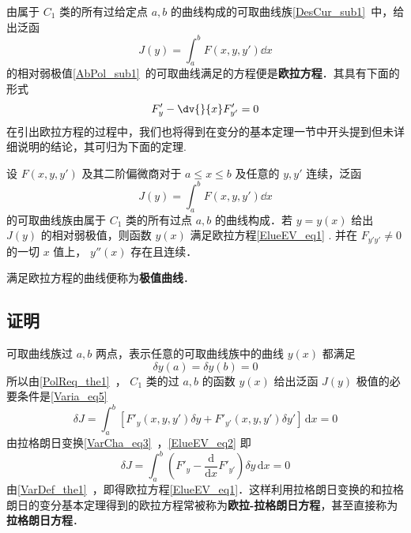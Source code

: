 
由属于 $C_1$ 类的所有过给定点 $a,b$ 的曲线构成的可取曲线族\autoref{DesCur_sub1}~中，给出泛函 
\begin{equation}
J(y)=\int_a^bF(x,y,y')\dd x
\end{equation}
的相对弱极值\autoref{AbPol_sub1}~的可取曲线满足的方程便是\textbf{欧拉方程}．其具有下面的形式
\begin{equation}\label{ElueEV_eq1}
F'_y-\dv{}{x}F'_{y'}=0
\end{equation}
在引出欧拉方程的过程中，我们也将得到在变分的基本定理一节中开头提到但未详细说明的结论，其可归为下面的定理.
\begin{theorem}{}
设 $F(x,y,y')$ 及其二阶偏微商对于 $a\leq x\leq b$ 及任意的 $y,y'$ 连续，泛函
\begin{equation}
J(y)=\int_a^b F(x,y,y')\dd x
\end{equation}
的可取曲线族由属于 $C_1$ 类的所有过点 $a,b$ 的曲线构成．若 $y=y(x)$ 给出 $J(y)$ 的相对弱极值，则函数 $y(x)$ 满足欧拉方程\autoref{ElueEV_eq1} .
并在 $F_{y'y'}\neq0$ 的一切 $x$ 值上， $y''(x)$ 存在且连续．

\end{theorem}
满足欧拉方程的曲线便称为\textbf{极值曲线}．
\subsection{证明}
可取曲线族过 $a,b$ 两点，表示任意的可取曲线族中的曲线 $y(x)$ 都满足 
\begin{equation}
\delta y(a)=\delta y(b)=0
\end{equation}
所以由\autoref{PolReq_the1}~， $C_1$ 类的过 $a,b$ 的函数 $y(x)$ 给出泛函 $J(y)$ 极值的必要条件是\autoref{Varia_eq5}~
\begin{equation}\label{ElueEV_eq2}
\delta J=\int_a^b \left[F'_y(x,y,y')\delta y+F'_{y'}(x,y,y')\delta y' \right]  \,\mathrm{d}{x} =0
\end{equation}
由拉格朗日变换\autoref{VarCha_eq3}~，\autoref{ElueEV_eq2} 即
\begin{equation}
\delta J=\int_a^b \left(F'_y- \frac{\mathrm{d}{}}{\mathrm{d}{x}} F'_{y'} \right) \delta y \,\mathrm{d}{x} =0
\end{equation}
由\autoref{VarDef_the1}~，即得欧拉方程\autoref{ElueEV_eq1}．这样利用拉格朗日变换的和拉格朗日的变分基本定理得到的欧拉方程常被称为\textbf{欧拉-拉格朗日方程}，甚至直接称为\textbf{拉格朗日方程}．

